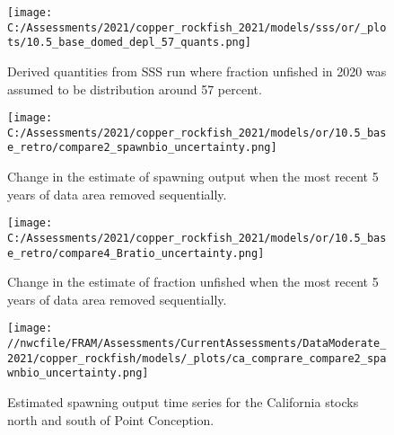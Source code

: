 \documentclass[11pt,
  english,
  a4paper,
]{article}
\begin{document}
\tagmcend\tagstructend

\newpage


\begin{figure}
\centering
\texttt{[image: C:/Assessments/2021/copper\_rockfish\_2021/models/sss/or/\_plots/10.5\_base\_domed\_depl\_57\_quants.png]}
\caption{Derived quantities from SSS run where fraction unfished in 2020 was assumed to be distribution around 57 percent.\label{fig:sss-quant-57}}
\end{figure}

\tagmcend\tagstructend

\newpage


\begin{figure}
\centering
\texttt{[image: C:/Assessments/2021/copper\_rockfish\_2021/models/or/10.5\_base\_retro/compare2\_spawnbio\_uncertainty.png]}
\caption{Change in the estimate of spawning output when the most recent 5 years of data area removed sequentially.\label{fig:retro-ssb}}
\end{figure}

\tagmcend\tagstructend


\begin{figure}
\centering
\texttt{[image: C:/Assessments/2021/copper\_rockfish\_2021/models/or/10.5\_base\_retro/compare4\_Bratio\_uncertainty.png]}
\caption{Change in the estimate of fraction unfished when the most recent 5 years of data area removed sequentially.\label{fig:retro-depl}}
\end{figure}

\tagmcend\tagstructend

\clearpage


\begin{figure}
\centering
\texttt{[image: //nwcfile/FRAM/Assessments/CurrentAssessments/DataModerate\_2021/copper\_rockfish/models/\_plots/ca\_comprare\_compare2\_spawnbio\_uncertainty.png]}
\caption{Estimated spawning output time series for the California stocks north and south of Point Conception.\label{fig:ssb-ca-compare}}
\end{figure}
\end{document}
